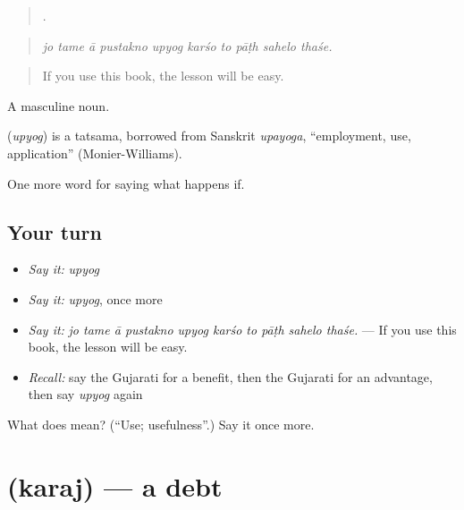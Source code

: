 \begin{quote}
         .
\end{quote}

\begin{quote}
\emph{jo tame ā pustakno upyog karśo to pāṭh sahelo thaśe.}
\end{quote}

\begin{quote}
If you use this book, the lesson will be easy.
\end{quote}

A masculine noun.

\begin{cousinweb}
\textbf{} (\emph{upyog}) is a tatsama, borrowed from Sanskrit \emph{upayoga}, \textquotedblleft{}employment, use, application\textquotedblright{} (Monier-Williams).
\end{cousinweb}

\begin{grammarlens}[title={What you've built}]
One more word for saying what happens if.
\end{grammarlens}

\subsection*{Your turn}
\begin{itemize}
\raggedright
  \item \emph{Say it:} \emph{upyog}
  \item \emph{Say it:} \emph{upyog}, once more
  \item \emph{Say it:} \emph{jo tame ā pustakno upyog karśo to pāṭh sahelo thaśe.} — If you use this book, the lesson will be easy.
  \item \emph{Recall:} say the Gujarati for a benefit, then the Gujarati for an advantage, then say \emph{upyog} again
\end{itemize}

\begin{tcolorbox}[breakable,colback=teal!4,colframe=teal!35!black,title={Before you move on}]
What does  mean? (\textquotedblleft{}Use; usefulness\textquotedblright{}.) Say it once more.
\end{tcolorbox}
\section[\texorpdfstring{\gu{કરજ} (karaj)}{કરજ (karaj)}]{ (karaj) — a debt}

